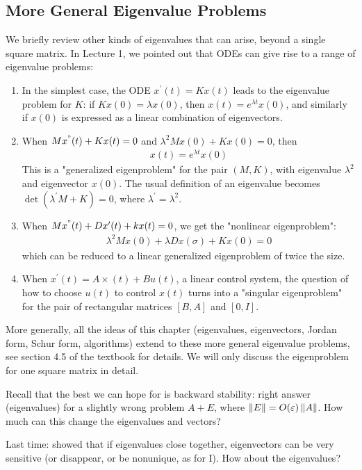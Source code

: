 \documentclass[11pt]{article}
\numberwithin{equation}{section}
\begin{document}
\subsection{More General Eigenvalue Problems}
We briefly review other kinds of eigenvalues that can arise, beyond a single square matrix. In Lecture 1, we pointed out that ODEs can give rise to a range of eigenvalue problems:
\begin{enumerate}
    \item In the simplest case, the ODE $x^{\prime}(t)=K x(t)$ leads to the eigenvalue problem for $K$: if $Kx(0) = \lambda x(0)$, then $x(t) = e^{\lambda t}x(0)$,
    and similarly if $x(0)$ is expressed as a linear combination of eigenvectors.
    \item When $M x^{"}(t)+K x(t)=0$ and $\lambda^2 Mx(0) + Kx(0) = 0$, then \begin{align*}
        x(t) = e^{\lambda t}x(0)
    \end{align*}
    This is a "generalized eigenproblem" for the pair $(M,K)$, with eigenvalue $\lambda^2$ and eigenvector $x(0)$.
    The usual definition of an eigenvalue becomes $\operatorname{det}(\lambda^\prime M + K) = 0$, where $\lambda^{\prime}=\lambda^{2}$.
    \item When $M x^{"}(t)+D x^{\prime}(t)+k x(t)=0$, we get the "nonlinear eigenproblem":\begin{align*}
        \lambda^{2} M x(0)+\lambda D x(\sigma)+K x(0)=0
    \end{align*}
    which can be reduced to a linear generalized eigenproblem of twice the size.
    \item When $x^{\prime}(t)=A \times(t)+B u(t)$, a linear control system, the question of how to choose $u(t)$ to control $x(t)$ turns into a "singular eigenproblem"
    for the pair of rectangular matrices $[B,A]$ and $[0,I]$.
\end{enumerate}

More generally, all the ideas of this chapter (eigenvalues, eigenvectors, Jordan form, Schur form, algorithms) extend to these more general eigenvalue problems, 
see section 4.5 of the textbook for details. We will only discuss the eigenproblem for one square matrix in detail.

Recall that the best we can hope for is backward stability: right answer (eigenvalues)
for a slightly wrong problem $A + E$, where $\left\| E \right\| = O(\varepsilon)\left\| A \right\|$. How much can this change the eigenvalues and vectors?

Last time: showed that if eigenvalues close together, eigenvectors can be very sensitive (or disappear, or be nonunique, as for I). How about the eigenvalues?
\end{document}

